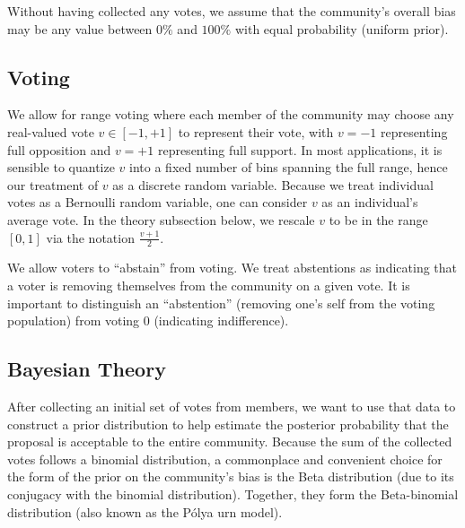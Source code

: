 \documentclass[format=acmsmall, review=true, screen=true, anonymous=true]{acmart}
\begin{document}
Without having collected any votes, we assume that the community's overall bias may be any value between $0\%$ and $100\%$ with equal probability (uniform prior).

\subsection{Voting}


We allow for range voting where each member of the community may choose any real-valued vote $v \in [-1,+1]$ to
represent their vote, with $v = -1$ representing full opposition and $v=+1$ representing full support.  In most applications, it is sensible to quantize $v$ into a fixed number of bins spanning the full range, hence our treatment of $v$ as a discrete random variable.  Because we treat individual votes as a Bernoulli random variable, one can consider $v$ as an individual's average vote.  In the theory subsection below, we rescale $v$ to be in the range $[0,1]$ via the notation $\frac{v + 1}{2}$.

We allow voters to ``abstain'' from voting.
We treat abstentions as indicating that a voter is removing themselves from the community on a given vote.
It is important to distinguish an ``abstention'' (removing one's self from the voting population) from voting $0$ (indicating indifference).

\subsection{Bayesian Theory}



After collecting an initial set of votes from members, we want to use that data to construct a prior distribution to help estimate the posterior probability that the proposal is acceptable to the entire community.  Because the sum of  the collected votes follows a binomial distribution, a commonplace and convenient choice for the form of the prior on the community's bias is the Beta distribution (due to its conjugacy with the binomial distribution).  Together, they form the Beta-binomial distribution (also known as the P\'olya urn model).
\end{document}
